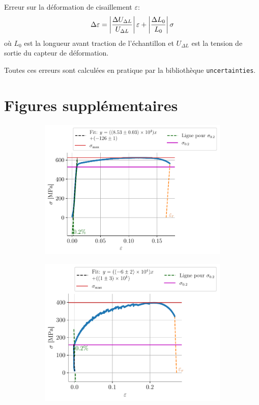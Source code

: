 Erreur sur la déformation de cisaillement \(\varepsilon\):
\begin{equation}
    \Delta \varepsilon = \left|\frac{\Delta U_{\Delta L}}{U_{\Delta L}}\right| \varepsilon + \left|\frac{\Delta L_0}{L_0}\right| \sigma
\end{equation}
où \(L_0\) est la longueur avant traction de l'échantillon et \(U_{\Delta L}\) est la tension de sortie du capteur de déformation.

Toutes ces erreurs sont calculées en pratique par la bibliothèque \texttt{uncertainties}.


\section{Figures supplémentaires}
\label{sec:fig_supp}

\begin{figure}
    \centering
    \begin{subfigure}{0.48\linewidth}
        \centering
        \includegraphics[width=\linewidth]{figures/froid1all.pdf}
        \caption{}
        \label{fig:froid1}
    \end{subfigure}
    \begin{subfigure}{0.48\linewidth}
        \centering
        \includegraphics[width=\linewidth]{figures/chaud4all.pdf}

\end{subfigure}
\end{figure}
